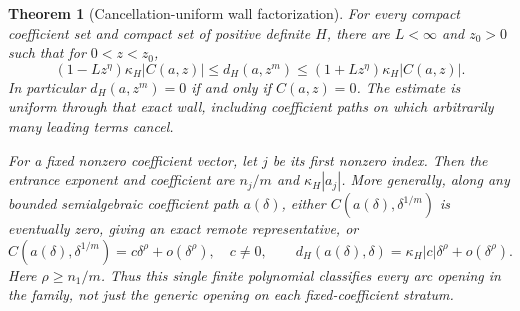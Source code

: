 \documentclass[11pt,reqno]{amsart}
\numberwithin{equation}{section}
\newtheorem{theorem}{Theorem}[section]
\theoremstyle{definition}
\theoremstyle{remark}
\begin{document}
\begin{theorem}[Cancellation-uniform wall factorization]\label{thm:wall}
For every compact coefficient set and compact set of positive definite $H$, there are $L<\infty$ and $z_0>0$ such that for $0<z<z_0$,
\begin{equation}\label{eq:relative-wall}
 (1-Lz^\eta)\kappa_H|C(a,z)|
 \le d_H(a,z^m)\le
 (1+Lz^\eta)\kappa_H|C(a,z)|.
\end{equation}
In particular $d_H(a,z^m)=0$ if and only if $C(a,z)=0$. The estimate is uniform through that exact wall, including coefficient paths on which arbitrarily many leading terms cancel.

For a fixed nonzero coefficient vector, let $j$ be its first nonzero index. Then the entrance exponent and coefficient are $n_j/m$ and $\kappa_H|a_j|$. More generally, along any bounded semialgebraic coefficient path $a(\delta)$, either $C(a(\delta),\delta^{1/m})$ is eventually zero, giving an exact remote representative, or
\begin{equation}\label{eq:arc-opening}
 C(a(\delta),\delta^{1/m})=c\delta^\rho+o(\delta^\rho),\quad c\ne0,
 \qquad d_H(a(\delta),\delta)=\kappa_H|c|\delta^\rho+o(\delta^\rho).
\end{equation}
Here $\rho\ge n_1/m$. Thus this single finite polynomial classifies every arc opening in the family, not just the generic opening on each fixed-coefficient stratum.
\end{theorem}
\end{document}
